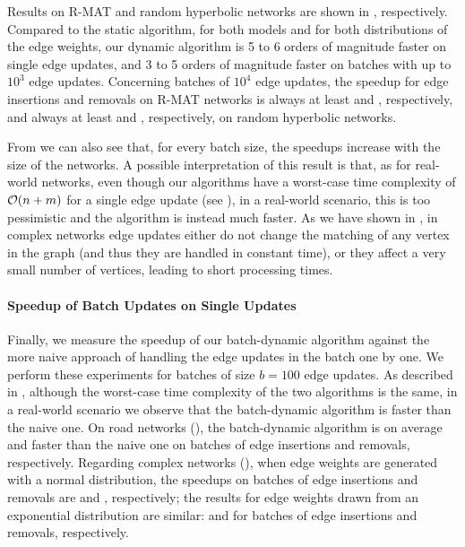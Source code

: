 Results on R-MAT and random hyperbolic networks are shown in
, respectively.
Compared to the static \suitor algorithm, for both models and for both
distributions of the edge weights, our dynamic algorithm is 5 to 6 orders of
magnitude faster on single edge updates, and 3 to 5 orders of magnitude faster
on batches with up to $10^3$ edge updates. Concerning batches of $10^4$ edge
updates, the speedup for edge insertions and removals on R-MAT networks is
always at least \speedupRMATInsBTenThou and \speedupRMATRemBTenThou,
respectively, and always at least \speedupHYPInsBTenThou and
\speedupHYPRemBTenThou, respectively, on random hyperbolic networks.

From  we can also see
that, for every batch size, the speedups increase with the size of the
networks. A possible interpretation of this result is that,
as for real-world networks, even though
our algorithms have a worst-case time complexity of $\mathcal{O}(n + m)$ for a
single edge update (see ),
in a real-world scenario,
this is too pessimistic and the algorithm is instead much faster.
As we have shown in , in
complex networks edge updates either do not change the matching of any vertex
in the graph (and thus they are handled in constant time), or they affect
a very small number of vertices, leading to short processing times.

\paragraph{Speedup of Batch Updates on Single Updates}
%
Finally, we measure the speedup of our batch-dynamic algorithm against the more
naive approach of handling the edge updates in the batch one by one. We perform
these experiments for batches of size $b = 100$ edge updates. As described in
, although the worst-case time
complexity of the two algorithms is the same, in a real-world scenario we
observe that the batch-dynamic algorithm is faster than the naive one. On
road networks (), the batch-dynamic
algorithm is on average \speedBatchOverSingleRoadHundIns and
\speedBatchOverSingleRoadHundRem faster than the naive one on batches of edge
insertions and removals, respectively. Regarding complex networks
(), when edge weights are generated with a
normal distribution, the speedups on batches of edge insertions and removals
are \speedBatchOverSingleCplxHundInsNorm and
\speedBatchOverSingleCplxHundRemNorm, respectively; the results for edge
weights drawn from an exponential distribution are similar:
\speedBatchOverSingleCplxHundInsExp and \speedBatchOverSingleCplxHundRemExp for
batches of edge insertions and removals, respectively.

